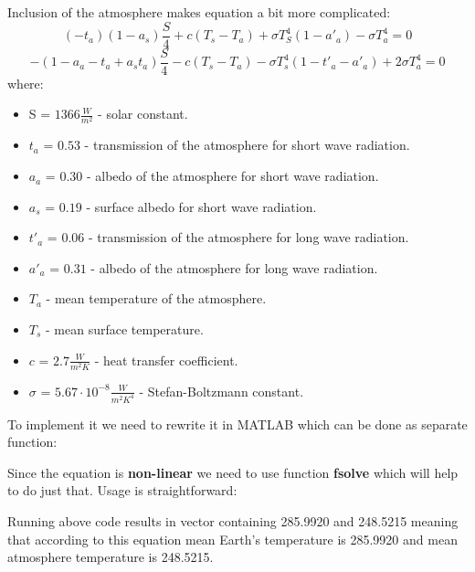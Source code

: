 \documentclass[12pt]{article}
\begin{document}
Inclusion of the atmosphere makes equation a bit more complicated:
      \begin{equation}
(-t_a)(1-a_s)\frac{S}{4} + c(T_s - T_a) + \sigma T_S^4 (1-a'_a) - \sigma T_a^4 = 0
\end{equation}
\begin{equation}
-(1 - a_a - t_a + a_s t_a) \frac{S}{4} - c(T_s - T_a) - \sigma T_s^4 (1 - t'_a - a'_a) + 2 \sigma T_a^4 = 0
\end{equation}
where:
\begin{itemize}
	\item S = $1366 \frac{W}{m^2}$ - solar constant.
	\item $t_a$ = $0.53$ - transmission of the atmosphere for short wave radiation.
	\item $a_a$ = $0.30$ - albedo of the atmosphere for short wave radiation.
	\item $a_s$ = $0.19$ - surface albedo for short wave radiation.
	\item $t'_a$ = $0.06$ - transmission of the atmosphere for long wave radiation.
	\item $a'_a$ = $0.31$ - albedo of the atmosphere for long wave radiation.
	\item $T_a$ - mean temperature of the atmosphere.
	\item $T_s$ - mean surface temperature.
	\item $c$ = $2.7 \frac{W}{m^2K}$ - heat transfer coefficient.
	\item $\sigma$ = $5.67 \cdot 10^{-8} \frac{W}{m^2K^4}$ - Stefan-Boltzmann constant.
\end{itemize}

To implement it we need to rewrite it in MATLAB which can be done as separate function:


Since the equation is \textbf{non-linear} we need to use function \textbf{fsolve} which will help to do just that. Usage is straightforward:



Running above code results in vector containing 285.9920 and 248.5215 meaning that according to this equation mean Earth's temperature is 285.9920 and mean atmosphere temperature is 248.5215.
\end{document}
